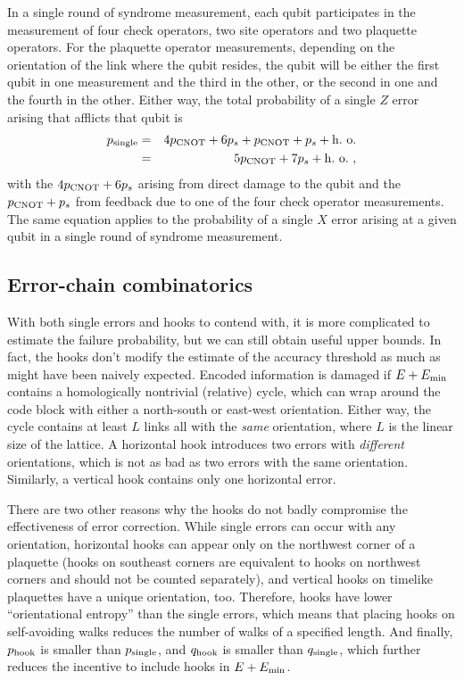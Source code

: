 In a single round of syndrome measurement, each qubit participates in the measurement of four check operators, two site operators and two plaquette operators. For the plaquette operator measurements, depending on the orientation of the link where the qubit resides, the qubit will be either the first qubit in one measurement and the third in the other, or the second in one and the fourth in the other. Either way, the total probability of a single $Z$ error arising that afflicts that qubit is
\begin{eqnarray}
p_{\rm single}&= &4 p_{\rm CNOT} + 6 p_s + p_{\rm CNOT} + p_s+{\rm
h.~o.}\nonumber\\
&=& 5p_{\rm CNOT} + 7 p_s +{\rm h.~o.}~,
\end{eqnarray}
with the $4 p_{\rm CNOT} + 6 p_s$ arising from direct damage to the qubit and the $p_{\rm CNOT} + p_s$ from feedback due to one of the four check operator measurements. The same equation applies to the probability of a single $X$ error arising at a given qubit in a single round of syndrome measurement.

\subsection{Error-chain combinatorics}

With both single errors and hooks to contend with, it is more
complicated to estimate the failure probability, but we can still obtain useful upper
bounds.  In fact, the hooks don't modify the estimate of the accuracy threshold as much as might have been naively expected. Encoded information is damaged if $E+E_{\rm min}$ contains a homologically nontrivial (relative) cycle, which can wrap around the code block with either a north-south or east-west orientation. Either way, the cycle contains at least $L$ links all with the {\em same} orientation, where $L$ is the linear size of the lattice. A horizontal hook introduces two errors with {\em different} orientations, which is not as bad as two errors with the same orientation. Similarly, a vertical hook contains only one horizontal error.

There are two other reasons why the hooks do not badly compromise the effectiveness of error correction. While single errors can occur with any orientation, horizontal hooks can appear only on the northwest corner of a plaquette (hooks on southeast corners are equivalent to hooks on northwest corners and should not be counted separately), and vertical hooks on timelike plaquettes have a unique orientation, too. Therefore, hooks have lower ``orientational entropy'' than the single errors, which means that placing hooks on self-avoiding walks reduces the number of walks of a specified length. And finally, $p_{\rm hook}$ is smaller than $p_{\rm single}$, and $q_{\rm hook}$ is smaller than $q_{\rm single}$, which further reduces the incentive to include hooks in $E+E_{\rm min}$.

